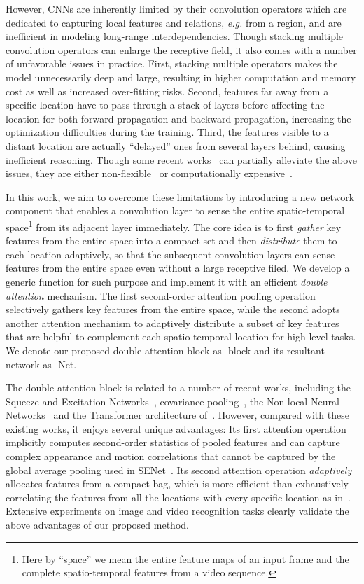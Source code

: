 \documentclass{article}
\begin{document}
However, CNNs are inherently limited by their convolution operators which are dedicated to capturing local features and relations, \emph{e.g.} from a  region, and are inefficient in modeling long-range interdependencies. 
Though stacking multiple convolution operators can enlarge the receptive field,  it also comes with a number of unfavorable issues in practice. First, stacking multiple operators makes the model unnecessarily deep and large, resulting in higher computation and memory cost as well as increased over-fitting risks. Second, features far away from a specific location have to pass through a stack of layers before 
affecting the location for both forward propagation and backward propagation, increasing the optimization difficulties during the training.
Third, the features visible to a distant location are actually ``delayed'' ones from several layers behind, 
causing inefficient reasoning. Though some recent works~\cite{hu2017,wang17non} can partially alleviate the above issues, they are either non-flexible~\cite{hu2017} or computationally expensive~\cite{wang17non}.

In this work, we aim to overcome these limitations by introducing a new network component that enables a convolution layer to sense the entire spatio-temporal space\footnote{Here by ``space'' we mean the entire feature maps of an input frame and the complete spatio-temporal features from a video sequence.} from its adjacent layer immediately.
The core idea is to first \textit{gather} key features from the entire space into a compact set and then \textit{distribute} them to each location adaptively, so that the subsequent convolution layers can sense features from the entire space even without a large receptive filed. We develop a generic function for such purpose and implement it with an efficient \textit{double attention} mechanism. The first second-order attention pooling operation selectively gathers key features from the entire space, while the second adopts another attention mechanism to adaptively distribute a subset of key features that are helpful to complement each spatio-temporal location for high-level tasks. 
We denote our proposed double-attention block as -block and its resultant network as  -Net. 

The double-attention block is related to a number of recent works, including the Squeeze-and-Excitation Networks~\cite{hu2017}, covariance pooling~\cite{li2017second}, the Non-local Neural Networks~\cite{wang17non} and the Transformer architecture of~\cite{vaswani2017attention}. However, compared with these existing works, it  enjoys several unique advantages:
Its first attention operation implicitly computes second-order statistics of pooled features and can capture complex appearance and motion correlations that cannot be captured by the global average pooling used in SENet~\cite{hu2017}. Its second attention operation \textit{adaptively} allocates features from a compact bag, which is more efficient than exhaustively correlating the features from all the locations with every specific location as in~\cite{wang17non,vaswani2017attention}. Extensive experiments on image and video recognition tasks clearly validate the above advantages of our proposed method.
\end{document}
